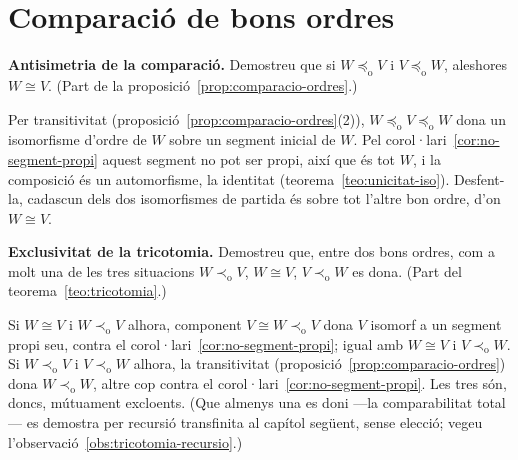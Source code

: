 \section{Comparació de bons ordres}\label{prac:comparacio-ordres}

\begin{exercici}
\textbf{Antisimetria de la comparació.} Demostreu que si \(W\preceq_{\mathrm o}V\) i \(V\preceq_{\mathrm o}W\), aleshores \(W\cong V\). (Part de la proposició~\ref{prop:comparacio-ordres}.)
\end{exercici}
\begin{solucio}
Per transitivitat (proposició~\ref{prop:comparacio-ordres}(2)), \(W\preceq_{\mathrm o}V\preceq_{\mathrm o}W\) dona un isomorfisme d'ordre de \(W\) sobre un segment inicial de \(W\). Pel corol·lari~\ref{cor:no-segment-propi} aquest segment no pot ser propi, així que és tot \(W\), i la composició és un automorfisme, la identitat (teorema~\ref{teo:unicitat-iso}). Desfent-la, cadascun dels dos isomorfismes de partida és sobre tot l'altre bon ordre, d'on \(W\cong V\).
\end{solucio}

\begin{exercici}
\textbf{Exclusivitat de la tricotomia.} Demostreu que, entre dos bons ordres, com a molt una de les tres situacions \(W\prec_{\mathrm o}V\), \(W\cong V\), \(V\prec_{\mathrm o}W\) es dona. (Part del teorema~\ref{teo:tricotomia}.)
\end{exercici}
\begin{solucio}
Si \(W\cong V\) i \(W\prec_{\mathrm o}V\) alhora, component \(V\cong W\prec_{\mathrm o}V\) dona \(V\) isomorf a un segment propi seu, contra el corol·lari~\ref{cor:no-segment-propi}; igual amb \(W\cong V\) i \(V\prec_{\mathrm o}W\). Si \(W\prec_{\mathrm o}V\) i \(V\prec_{\mathrm o}W\) alhora, la transitivitat (proposició~\ref{prop:comparacio-ordres}) dona \(W\prec_{\mathrm o}W\), altre cop contra el corol·lari~\ref{cor:no-segment-propi}. Les tres són, doncs, mútuament excloents. (Que almenys una es doni ---la comparabilitat total--- es demostra per recursió transfinita al capítol següent, sense elecció; vegeu l'observació~\ref{obs:tricotomia-recursio}.)
\end{solucio}
